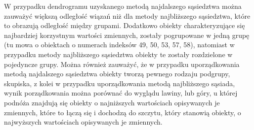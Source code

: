 \documentclass[12pt,a4paper]{report}
\begin{document}
{W przypadku dendrogramu uzyskanego metodą najdalszego sąsiedztwa można
zauważyć większą odległość wiązań niż dla metody najbliższego
sąsiedztwa, które to obrazują odległość między grupami. Dodatkowo
obiekty charakteryzujące się najbardziej korzystnym wartości zmiennych,
zostały pogrupowane w jedną grupę (tu mowa o obiektach o numerach
indeksów 49, 50, 53, 57, 58), natomiast w przypadku metody najbliższego
sąsiedztwa obiekty te zostały rozdzielone w pojedyncze grupy. Można
również zauważyć, że w przypadku uporządkowania metodą najdalszego
sąsiedztwa obiekty tworzą pewnego rodzaju podgrupy, skupiska, z kolei w
przypadku uporządkowania metodą najbliższego sąsiada, wynik
porządkowania można porównać do wyglądu lawiny, lub góry, u której
podnóża znajdują się obiekty o najniższych wartościach opisywanych je
zmiennych, które to łączą się i dochodzą do szczytu, który stanowią
obiekty, o najwyższych wartościach opisywanych je zmiennych.

}
\end{document}

